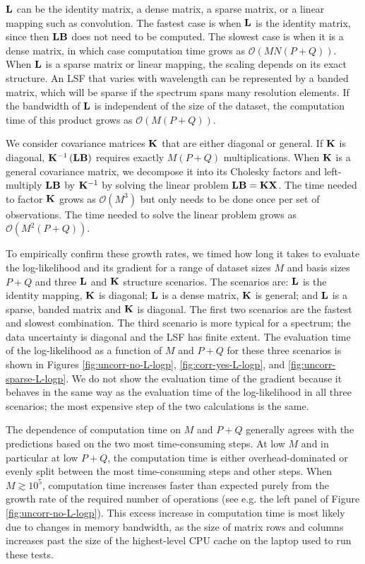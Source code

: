 \documentclass[manuscript]{aastex62}
\newcommand{\vx}[1]{{\bf {#1}}}
\begin{document}
$\vx{L}$ can be the identity matrix, a dense matrix, a sparse matrix, or a linear mapping such as convolution.
The fastest case is when $\vx{L}$ is the identity matrix, since then $\vx{L}\vx{B}$ does not need to be computed.
The slowest case is when it is a dense matrix, in which case computation time grows as $\mathcal{O}(MN(P+Q))$.
When $\vx{L}$ is a sparse matrix or linear mapping, the scaling depends on its exact structure.
An LSF that varies with wavelength can be represented by a banded matrix, which will be sparse if the spectrum spans many resolution elements.
If the bandwidth of $\vx{L}$ is independent of the size of the dataset, the computation time of this product grows as $\mathcal{O}(M(P+Q))$.

We consider covariance matrices $\vx{K}$ that are either diagonal or general.
If $\vx{K}$ is diagonal, $\vx{K}^{-1} \left(\vx{L} \vx{B}\right)$ requires exactly $M(P+Q)$ multiplications.
When $\vx{K}$ is a general covariance matrix, we decompose it into its Cholesky factors and left-multiply $\vx{L} \vx{B}$ by $\vx{K}^{-1}$ by solving the linear problem $\vx{\vx{L} \vx{B}} = \vx{K} \vx{X}$.
The time needed to factor $\vx{K}$ grows as $\mathcal{O}\left(M^3\right)$ but only needs to be done once per set of observations.
The time needed to solve the linear problem grows as $\mathcal{O}\left(M^2 (P+Q)\right)$.

To empirically confirm these growth rates, we timed how long it takes to evaluate the log-likelihood and its gradient for a range of dataset sizes $M$ and basis sizes $P+Q$ and three $\vx{L}$ and $\vx{K}$ structure scenarios.
The scenarios are: $\vx{L}$ is the identity mapping, $\vx{K}$ is diagonal; $\vx{L}$ is a dense matrix, $\vx{K}$ is general; and $\vx{L}$ is a sparse, banded matrix and $\vx{K}$ is diagonal.
The first two scenarios are the fastest and slowest combination.
The third scenario is more typical for a spectrum; the data uncertainty is diagonal and the LSF has finite extent.
The evaluation time of the log-likelihood as a function of $M$ and $P+Q$ for these three scenarios is shown in Figures \ref{fig:uncorr-no-L-logp}, \ref{fig:corr-yes-L-logp}, and \ref{fig:uncorr-sparse-L-logp}.
We do not show the evaluation time of the gradient because it behaves in the same way as the evaluation time of the log-likelihood in all three scenarios; the most expensive step of the two calculations is the same.

The dependence of computation time on $M$ and $P+Q$ generally agrees with the predictions based on the two most time-consuming steps.
At low $M$ and in particular at low $P+Q$, the computation time is either overhead-dominated or evenly split between the most time-consuming steps and other steps.
When $M \gtrsim 10^5$, computation time increases faster than expected purely from the growth rate of the required number of operations (see e.g. the left panel of Figure \ref{fig:uncorr-no-L-logp}).
This excess increase in computation time is most likely due to changes in memory bandwidth, as the size of matrix rows and columns increases past the size of the highest-level CPU cache on the laptop used to run these tests.
\end{document}

